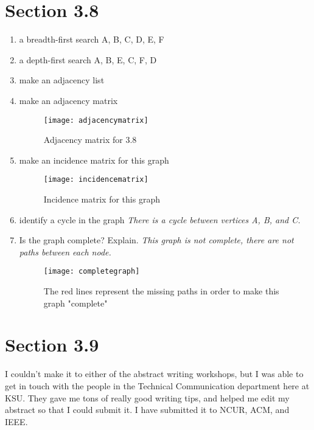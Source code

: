 \documentclass[11pt]{article}
\begin{document}
\section*{Section 3.8}
\begin{enumerate}
    \item a breadth-first search \newline
    A, B, C, D, E, F
    
    \item a depth-first search \newline
    A, B, E, C, F, D
    
    \item make an adjacency list
    
    \item make an adjacency matrix
    \begin{figure}[h]
        \centering
        \texttt{[image: adjacencymatrix]}
        \caption{Adjacency matrix for 3.8}
        \label{fig:my_label}
    \end{figure}
    \item make an incidence matrix for this graph
    \begin{figure}[h]
        \centering
        \texttt{[image: incidencematrix]}
        \caption{Incidence matrix for this graph}
        \label{fig:my_label}
    \end{figure}
    
    \item identify a cycle in the graph \newline
    \textit{There is a cycle between vertices A, B, and C.}
    
    \item Is the graph complete? Explain. \newline
   \textit{ This graph is not complete, there are not paths between each node.}
    
    \begin{figure}[h]
        \centering
        \texttt{[image: completegraph]}
        \caption{The red lines represent the missing paths in order to make this graph "complete"}
        \label{fig:my_label}
    \end{figure}
\end{enumerate}

\section*{Section 3.9}
I couldn't make it to either of the abstract writing workshops, but I was able to get in touch with the people in the Technical Communication department here at KSU. They gave me tons of really good writing tips, and helped me edit my abstract so that I could submit it. I have submitted it to NCUR, ACM, and IEEE. 
\end{document}
